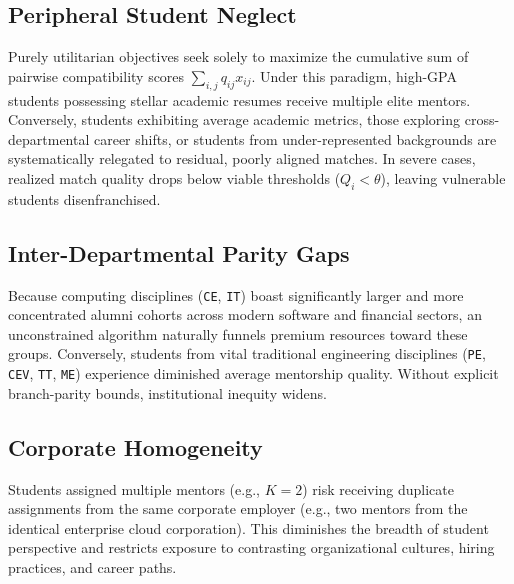 \subsection{Peripheral Student Neglect}
Purely utilitarian objectives seek solely to maximize the cumulative sum of pairwise compatibility scores $\sum_{i,j} q_{ij} x_{ij}$. Under this paradigm, high-GPA students possessing stellar academic resumes receive multiple elite mentors. Conversely, students exhibiting average academic metrics, those exploring cross-departmental career shifts, or students from under-represented backgrounds are systematically relegated to residual, poorly aligned matches. In severe cases, realized match quality drops below viable thresholds ($Q_i < \theta$), leaving vulnerable students disenfranchised.

\subsection{Inter-Departmental Parity Gaps}
Because computing disciplines (\texttt{CE}, \texttt{IT}) boast significantly larger and more concentrated alumni cohorts across modern software and financial sectors, an unconstrained algorithm naturally funnels premium resources toward these groups. Conversely, students from vital traditional engineering disciplines (\texttt{PE}, \texttt{CEV}, \texttt{TT}, \texttt{ME}) experience diminished average mentorship quality. Without explicit branch-parity bounds, institutional inequity widens.

\subsection{Corporate Homogeneity}
Students assigned multiple mentors (e.g., $K=2$) risk receiving duplicate assignments from the same corporate employer (e.g., two mentors from the identical enterprise cloud corporation). This diminishes the breadth of student perspective and restricts exposure to contrasting organizational cultures, hiring practices, and career paths.

